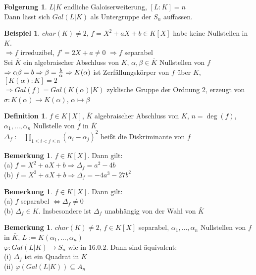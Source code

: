 \documentclass[10pt,a4paper,numbers=endperiod]{scrreprt}
\theoremstyle{definition}
\newtheorem{defi}[satz]{Definition}
\newtheorem{bem}[satz]{Bemerkung}
\newtheorem{bsp}[satz]{Beispiel}
\newtheorem{folg}[satz]{Folgerung}
\begin{document}
\begin{folg}
	$L|K$ endliche Galoiserweiterung, $[L:K] = n$\\
	Dann lässt sich $Gal(L|K)$ als Untergruppe der $S_n$ auffassen.
\end{folg}

\begin{bsp}
	$char(K) \neq 2$, $f = X^2 + aX + b \in K[X]$ habe keine Nullstellen in $K$.\\
	$\Rightarrow f$ irreduzibel, $f' = 2X +a \neq 0$ $\Rightarrow f$ separabel\\
	Sei $\overline{K}$ ein algebraischer Abschluss von $K$, $\alpha, \beta \in \overline{K}$ Nullstellen von $f$ $\Rightarrow \alpha \beta = b \Rightarrow \beta = \frac{b}{\alpha}\\ \Rightarrow K(\alpha)$ ist Zerfällungskörper von $f$ über $K$, $[K(\alpha):K] = 2$\\ $\Rightarrow Gal(f) = Gal(K(\alpha)|K)$ zyklische Gruppe der Ordnung 2, erzeugt von $\sigma: K(\alpha) \rightarrow K(\alpha)$, $\alpha \mapsto \beta$
\end{bsp}

\begin{defi}
	$f \in K[X]$, $\overline{K}$ algebraischer Abschluss von $K$, $n = \deg(f)$, $\alpha_1, \ldots, \alpha_n$ Nullstelle von $f$ in $\overline{K}$\\
	$\varDelta_f := \prod\limits_{1 \leq i < j \leq n} (\alpha_i - \alpha_j)^2$ heißt die Diskriminante von $f$
\end{defi}

\begin{bem}
	$f \in K[X]$. Dann gilt:\\
	(a) $f = X^2 + aX + b \Rightarrow \varDelta_f = a^2-4b$\\
	(b) $f = X^3 + aX + b \Rightarrow \varDelta_f = -4a^3 - 27b^2$
\end{bem}

\begin{bem}
	$f \in K[X]$. Dann gilt:\\
	(a) $f$ separabel $\Leftrightarrow \varDelta_f \neq 0$\\
	(b) $\varDelta_f \in K$. Insbesondere ist $\varDelta_f$ unabhängig von der Wahl von $\bar{K}$
\end{bem}

\begin{bem}
	$char(K) \neq 2$, $f \in K[X]$ separabel, $\alpha_1, \ldots, \alpha_n$ Nullstellen von $f$ in $\bar{K}$, $L := K(\alpha_1, \ldots, \alpha_n)$\\
	$\varphi: Gal(L|K) \rightarrow S_n$ wie in 16.0.2. Dann sind äquivalent:\\
	(i) $\varDelta_f$ ist ein Quadrat in $K$\\
	(ii) $\varphi(Gal(L|K)) \subseteq A_n$
\end{bem}
\end{document}
